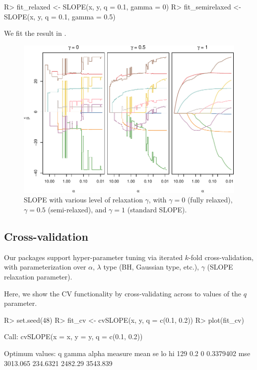 \documentclass[article]{jss}
\makeatletter
\let\Cref\crtCref
\let\natwidth\Gin@nat@width
\makeatother
\begin{document}
\begin{Code}
R> fit_relaxed <- SLOPE(x, y, q = 0.1, gamma = 0)
R> fit_semirelaxed <- SLOPE(x, y, q = 0.1, gamma = 0.5)
\end{Code}

We fit the result in \Cref{fig:relaxed-slope}.

\begin{figure}[t]
  \centering
  \includegraphics[width=\natwidth]{images/slope-relaxed.pdf}
  \caption{%
    SLOPE with various level of relaxation \(\gamma\), with
    \(\gamma = 0\) (fully relaxed), \(\gamma = 0.5\) (semi-relaxed),
    and \(\gamma = 1\) (standard SLOPE).
  }
  \label{fig:relaxed-slope}
\end{figure}

\subsection{Cross-validation}

Our packages support hyper-parameter tuning via iterated \(k\)-fold
cross-validation, with parameterization over \(\alpha\), \(\lambda\) type (BH,
Gaussian type, etc.), \(\gamma\) (SLOPE relaxation parameter).

Here, we show the CV functionality by cross-validating across
to values of the \(q\) parameter.

\begin{CodeChunk}
  \begin{CodeInput}
R> set.seed(48)
R> fit_cv <- cvSLOPE(x, y, q = c(0.1, 0.2))
R> plot(fit_cv)
\end{CodeInput}
  \begin{CodeOutput}
Call:
cvSLOPE(x = x, y = y, q = c(0.1, 0.2))

Optimum values:
      q gamma     alpha measure     mean       se      lo       hi
129 0.2     0 0.3379402     mse 3013.065 234.6321 2482.29 3543.839
\end{CodeOutput}
\end{CodeChunk}
\end{document}
